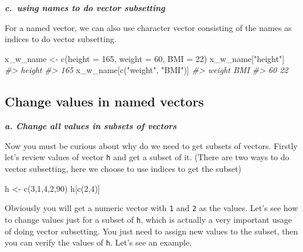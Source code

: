 \documentclass[
]{book}
\newenvironment{Shaded}{\begin{snugshade}}{\end{snugshade}}
\newcommand{\AttributeTok}[1]{\textcolor[rgb]{0.77,0.63,0.00}{#1}}
\newcommand{\CommentTok}[1]{\textcolor[rgb]{0.56,0.35,0.01}{\textit{#1}}}
\newcommand{\DecValTok}[1]{\textcolor[rgb]{0.00,0.00,0.81}{#1}}
\newcommand{\FunctionTok}[1]{\textcolor[rgb]{0.00,0.00,0.00}{#1}}
\newcommand{\NormalTok}[1]{#1}
\newcommand{\OtherTok}[1]{\textcolor[rgb]{0.56,0.35,0.01}{#1}}
\newcommand{\StringTok}[1]{\textcolor[rgb]{0.31,0.60,0.02}{#1}}
\begin{document}
\textbf{\emph{c.~using names to do vector subsetting}}

For a named vector, we can also use character vector consisting of the names as indices to do vector subsetting.

\begin{Shaded}
\begin{Highlighting}[]
\NormalTok{x\_w\_name }\OtherTok{\textless{}{-}} \FunctionTok{c}\NormalTok{(}\AttributeTok{height =} \DecValTok{165}\NormalTok{, }\AttributeTok{weight =} \DecValTok{60}\NormalTok{, }\AttributeTok{BMI =} \DecValTok{22}\NormalTok{)}
\NormalTok{x\_w\_name[}\StringTok{"height"}\NormalTok{]}
\CommentTok{\#\textgreater{} height }
\CommentTok{\#\textgreater{}    165}
\NormalTok{x\_w\_name[}\FunctionTok{c}\NormalTok{(}\StringTok{"weight"}\NormalTok{, }\StringTok{"BMI"}\NormalTok{)]}
\CommentTok{\#\textgreater{} weight    BMI }
\CommentTok{\#\textgreater{}     60     22}
\end{Highlighting}
\end{Shaded}

\hypertarget{change-values-in-named-vectors}{%
\subsection{Change values in named vectors}\label{change-values-in-named-vectors}}

\textbf{\emph{a. Change all values in subsets of vectors}}

Now you must be curious about why do we need to get subsets of vectors. Firstly let's review values of vector \texttt{h} and get a subset of it. (There are two ways to do vector subsetting, here we choose to use indices to get the subset)

\begin{Shaded}
\begin{Highlighting}[]
\NormalTok{h }\OtherTok{\textless{}{-}} \FunctionTok{c}\NormalTok{(}\DecValTok{3}\NormalTok{,}\DecValTok{1}\NormalTok{,}\DecValTok{4}\NormalTok{,}\DecValTok{2}\NormalTok{,}\DecValTok{90}\NormalTok{)}
\NormalTok{h[}\FunctionTok{c}\NormalTok{(}\DecValTok{2}\NormalTok{,}\DecValTok{4}\NormalTok{)]}
\end{Highlighting}
\end{Shaded}

Obviously you will get a numeric vector with \texttt{1} and \texttt{2} as the values. Let's see how to change values just for a subset of \texttt{h}, which is actually a very important usage of doing vector subsetting. You just need to assign new values to the subset, then you can verify the values of \texttt{h}. Let's see an example,
\end{document}
